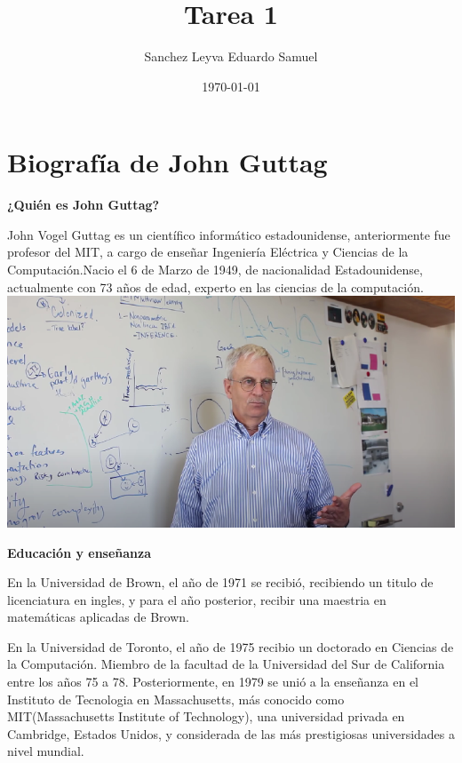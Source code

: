 \documentclass{article}
\title{Tarea 1}
\author{Sanchez Leyva Eduardo Samuel}
\date{\today}
\begin{document}
\maketitle

\newpage

\section{Biografía de John Guttag}
\textbf{¿Quién es John Guttag?}
\\

\par

John Vogel Guttag es un científico informático estadounidense, anteriormente fue profesor del MIT, a cargo de enseñar Ingeniería Eléctrica y Ciencias de la Computación.Nacio el 6 de  Marzo de 1949, de nacionalidad Estadounidense, actualmente con 73 años de edad, experto en las ciencias de la computación. \\

\includegraphics[scale=0.55]{image.png}

\textbf{Educación y enseñanza}

En la Universidad de Brown, el año de 1971 se recibió, recibiendo un titulo de licenciatura en ingles, y para el año posterior, recibir una maestria en matemáticas aplicadas de Brown.\\
\par En la Universidad de Toronto, el año de 1975 recibio un doctorado en Ciencias de la Computación.
Miembro de la facultad de la Universidad del Sur de California entre los años 75 a 78. Posteriormente, en 1979 se unió a la enseñanza en el Instituto de Tecnologia en Massachusetts, más conocido como MIT(Massachusetts Institute of Technology), una universidad privada en Cambridge, Estados Unidos, y considerada de las más prestigiosas universidades a nivel mundial.
\end{document}
